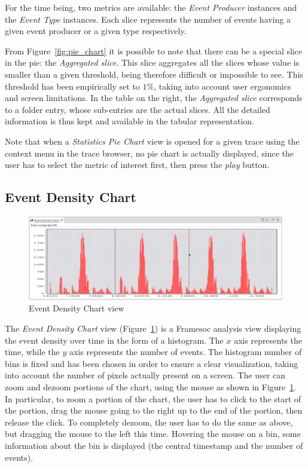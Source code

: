 \documentclass[twoside]{article}
\begin{document}
\begin{sloppypar}
For the time being, two metrics are available: the \emph{Event Producer} instances and the \emph{Event Type} instances. 
Each slice represents the number of events having a given event producer or a given type respectively.

From Figure~\ref{fig:pie_chart} it is possible to note that there can be a special slice in the pie: the \emph{Aggregated slice}.
This slice aggregates all the slices whose value is smaller than a given threshold, being therefore difficult or impossible to see.
This threshold has been empirically set to $1\%$, taking into account user ergonomics and screen limitations.
In the table on the right, the \emph{Aggregated slice} corresponds to a folder entry, whose sub-entries are the actual slices.
All the detailed information is thus kept and available in the tabular representation.

Note that when a \emph{Statistics Pie Chart} view is opened for a given trace using the context menu in the trace browser, no pie chart is actually displayed, since the user has to select the metric of interest first, then press the \emph{play} button.

\subsection{Event Density Chart}
\label{subsec:histogram}

\begin{figure}[h!]
  \centering
    \includegraphics[width=1.0\textwidth]{images/histogram_zoom.png}
  \caption{Event Density Chart view}
  \label{fig:histogram_zoom}
\end{figure}

The \emph{Event Density Chart} view (Figure~\ref{fig:histogram_zoom}) is a Framesoc analysis view displaying the event density over time in the form of a histogram.
The $x$ axis represents the time, while the $y$ axis represents the number of events.
The histogram number of bins is fixed and has been chosen in order to ensure a clear visualization, taking into account the number of pixels actually present on a screen. 
The user can zoom and dezoom portions of the chart, using the mouse as shown in Figure~\ref{fig:histogram_zoom}.
In particular, to zoom a portion of the chart, the user has to click to the start of the portion, drag the mouse going to the right up to the end of the portion, then release the click.
To completely dezoom, the user has to do the same as above, but dragging the mouse to the left this time.
Hovering the mouse on a bin, some information about the bin is displayed (the central timestamp and the number of events).


\end{sloppypar}
\end{document}
